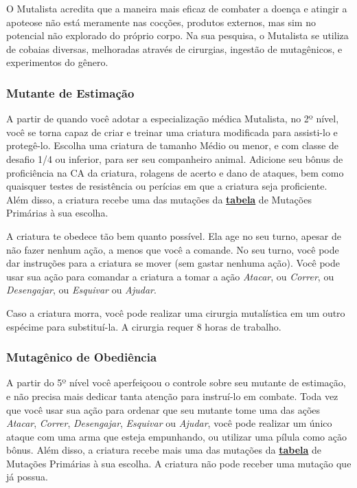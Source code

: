\documentclass[letterpaper,twocolumn,openany]{dndbook}
\begin{document}
	O Mutalista acredita que a maneira mais eficaz de combater a doença e atingir a apoteose não está meramente nas cocções, produtos externos, mas sim no potencial não explorado do próprio corpo. Na sua pesquisa, o Mutalista se utiliza de cobaias diversas, melhoradas através de cirurgias, ingestão de mutagênicos, e experimentos do gênero.
	
	\subsubsection{Mutante de Estimação}
	A partir de quando você adotar a especialização médica Mutalista, no 2º nível, você se torna capaz de criar e treinar uma criatura modificada para assisti-lo e protegê-lo. Escolha uma criatura de tamanho Médio ou menor, e com classe de desafio 1/4 ou inferior, para ser seu companheiro animal. Adicione seu bônus de proficiência na CA da criatura, rolagens de acerto e dano de ataques, bem como quaisquer testes de resistência ou perícias em que a criatura seja proficiente. Além disso, a criatura recebe uma das mutações da \hyperref[tab:mutacoes_primarias]{\textbf{tabela}} de Mutações Primárias à sua escolha.
	\par A criatura te obedece tão bem quanto possível. Ela age no seu turno, apesar de não fazer nenhum ação, a menos que você a comande. No seu turno, você pode dar instruções para a criatura se mover (sem gastar nenhuma ação). Você pode usar sua ação para comandar a criatura a tomar a ação \textit{Atacar}, ou \textit{Correr}, ou \textit{Desengajar}, ou \textit{Esquivar} ou \textit{Ajudar}.
	\par Caso a criatura morra, você pode realizar uma cirurgia mutalística em um outro espécime para substituí-la. A cirurgia requer 8 horas de trabalho.
	
	\subsubsection{Mutagênico de Obediência}
	A partir do 5º nível você aperfeiçoou o controle sobre seu mutante de estimação, e não precisa mais dedicar tanta atenção para instruí-lo em combate. Toda vez que você usar sua ação para ordenar que seu mutante tome uma das ações \textit{Atacar}, \textit{Correr}, \textit{Desengajar}, \textit{Esquivar} ou \textit{Ajudar}, você pode realizar um único ataque com uma arma que esteja empunhando, ou utilizar uma pílula como ação bônus. Além disso, a criatura recebe mais uma das mutações da \hyperref[tab:mutacoes_primarias]{\textbf{tabela}} de Mutações Primárias à sua escolha. A criatura não pode receber uma mutação que já possua.
	
\end{document}
